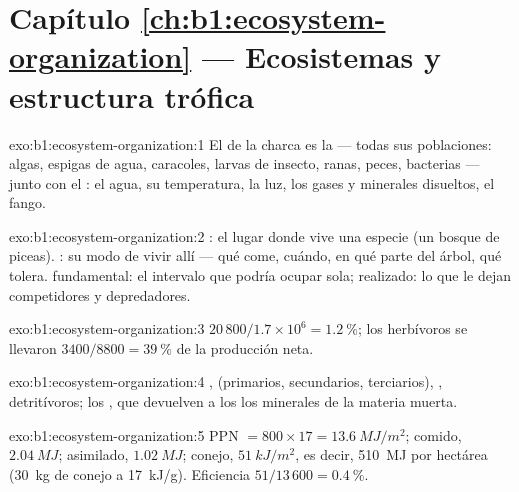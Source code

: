 \section*{Capítulo \ref{ch:b1:ecosystem-organization} --- Ecosistemas y estructura trófica}

\begin{solution}{exo:b1:ecosystem-organization:1}
El  de la charca es la  --- todas sus poblaciones: algas,
espigas de agua, caracoles, larvas de insecto, ranas, peces, bacterias ---
junto con el : el agua, su temperatura, la luz, los gases y minerales
disueltos, el fango.
\end{solution}

\begin{solution}{exo:b1:ecosystem-organization:2}
: el lugar donde vive una especie (un bosque de piceas). : su
modo de vivir allí --- qué come, cuándo, en qué parte del árbol, qué tolera.
 fundamental: el intervalo que podría ocupar sola; realizado: lo que le
dejan competidores y depredadores.
\end{solution}

\begin{solution}{exo:b1:ecosystem-organization:3}
$20\,800/1.7\times 10^6 = \qty{1.2}{\%}$; los herbívoros se llevaron
$3400/8800 = \qty{39}{\%}$ de la producción neta.
\end{solution}

\begin{solution}{exo:b1:ecosystem-organization:4}
,  (primarios, secundarios, terciarios),
, detritívoros; los , que devuelven a los
 los minerales de la materia muerta.
\end{solution}

\begin{solution}{exo:b1:ecosystem-organization:5}
PPN $= 800\times 17 = \qty{13.6}{MJ/m^2}$; comido, $\qty{2.04}{MJ}$;
asimilado, $\qty{1.02}{MJ}$; conejo, $\qty{51}{kJ/m^2}$, es decir,
\qty{510}{MJ} por hectárea (\qty{30}{kg} de conejo a \qty{17}{kJ/g}).
Eficiencia $51/13\,600 = \qty{0.4}{\%}$.
\end{solution}

